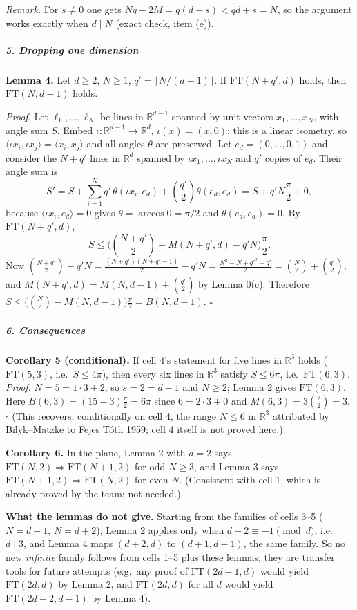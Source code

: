 \emph{Remark.} For \(s\ne0\) one gets \(Nq-2M=q(d-s)<qd+s=N\), so the
argument works exactly when \(d\mid N\) (exact check, item (e)).

\subparagraph{5. Dropping one dimension}\label{dropping-one-dimension}

\textbf{Lemma 4.} Let \(d\ge2\), \(N\ge1\),
\(q'=\lfloor N/(d-1)\rfloor\). If \(\mathrm{FT}(N+q',d)\) holds, then
\(\mathrm{FT}(N,d-1)\) holds.

\emph{Proof.} Let \(\ell_1,\dots,\ell_N\) be lines in
\(\mathbb R^{d-1}\) spanned by unit vectors \(x_1,\dots,x_N\), with
angle sum \(S\). Embed \(\iota:\mathbb R^{d-1}\to\mathbb R^d\),
\(\iota(x)=(x,0)\); this is a linear isometry, so
\(\langle\iota x_i,\iota x_j\rangle=\langle x_i,x_j\rangle\) and all
angles \(\theta\) are preserved. Let \(e_d=(0,\dots,0,1)\) and consider
the \(N+q'\) lines in \(\mathbb R^d\) spanned by
\(\iota x_1,\dots,\iota x_N\) and \(q'\) copies of \(e_d\). Their angle
sum is
\[S'=S+\sum_{i=1}^{N}q'\,\theta(\iota x_i,e_d)+\binom{q'}2\theta(e_d,e_d)=S+q'N\frac\pi2+0,\]
because \(\langle\iota x_i,e_d\rangle=0\) gives
\(\theta=\arccos0=\pi/2\) and \(\theta(e_d,e_d)=0\). By
\(\mathrm{FT}(N+q',d)\),
\[S\le\Big(\binom{N+q'}2-M(N+q',d)-q'N\Big)\frac\pi2.\] Now
\(\binom{N+q'}2-q'N=\frac{(N+q')(N+q'-1)}2-q'N=\frac{N^2-N+q'^2-q'}2=\binom N2+\binom{q'}2\),
and \(M(N+q',d)=M(N,d-1)+\binom{q'}2\) by Lemma 0(c). Therefore
\(S\le\big(\binom N2-M(N,d-1)\big)\frac\pi2=B(N,d-1)\). \(\square\)

\subparagraph{6. Consequences}\label{consequences}

\textbf{Corollary 5 (conditional).} If cell 4's statement for five lines
in \(\mathbb R^3\) holds (\(\mathrm{FT}(5,3)\), i.e.~\(S\le4\pi\)), then
every six lines in \(\mathbb R^3\) satisfy \(S\le6\pi\),
i.e.~\(\mathrm{FT}(6,3)\). \emph{Proof.} \(N=5=1\cdot3+2\), so
\(s=2=d-1\) and \(N\ge2\); Lemma 2 gives \(\mathrm{FT}(6,3)\). Here
\(B(6,3)=(15-3)\frac\pi2=6\pi\) since \(6=2\cdot3+0\) and
\(M(6,3)=3\binom22=3\). \(\square\) (This recovers, conditionally on
cell 4, the range \(N\le6\) in \(\mathbb R^3\) attributed by
Bilyk--Matzke to Fejes Tóth 1959; cell 4 itself is not proved here.)

\textbf{Corollary 6.} In the plane, Lemma 2 with \(d=2\) says
\(\mathrm{FT}(N,2)\Rightarrow\mathrm{FT}(N+1,2)\) for odd \(N\ge3\), and
Lemma 3 says \(\mathrm{FT}(N+1,2)\Rightarrow\mathrm{FT}(N,2)\) for even
\(N\). (Consistent with cell 1, which is already proved by the team; not
needed.)

\textbf{What the lemmas do not give.} Starting from the families of
cells 3--5 (\(N=d+1\), \(N=d+2\)), Lemma 2 applies only when
\(d+2\equiv-1\pmod d\), i.e.~\(d\mid3\), and Lemma 4 maps \((d+2,d)\) to
\((d+1,d-1)\), the same family. So no new \emph{infinite} family follows
from cells 1--5 plus these lemmas; they are transfer tools for future
attempts (e.g.~any proof of \(\mathrm{FT}(2d-1,d)\) would yield
\(\mathrm{FT}(2d,d)\) by Lemma 2, and \(\mathrm{FT}(2d,d)\) for all
\(d\) would yield \(\mathrm{FT}(2d-2,d-1)\) by Lemma 4).

